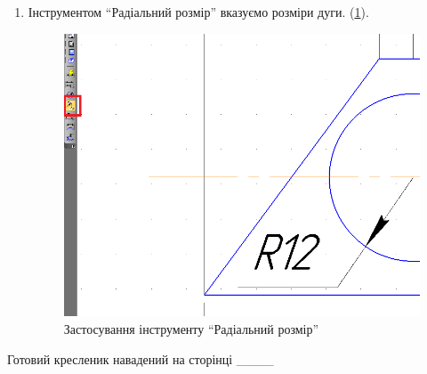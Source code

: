 \begin{enumerate}[leftmargin=*]
\newpage
 \item Інструментом ``Радіальний розмір'' вказуємо розміри дуги. (\ref{fig:lab3:radial_dimentions}).
   \begin{figure}[!ht]
     \centering
     \includegraphics[width=0.9\linewidth]{./images/lab3/step7.png}
     \caption{Застосування інструменту ``Радіальний розмір''}
     \label{fig:lab3:radial_dimentions} 
   \end{figure}

\end{enumerate}

\FloatBarrier
Готовий кресленик навадений на сторінці ____
